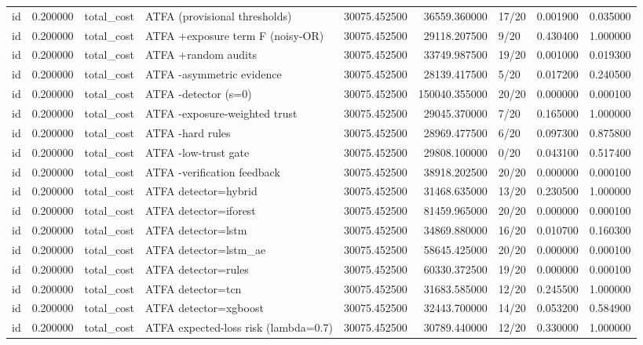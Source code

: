 \begin{tabular}{lrllrrlrr}
id & 0.200000 & total\_cost & ATFA (provisional thresholds) & 30075.452500 & 36559.360000 & 17/20 & 0.001900 & 0.035000 \\
id & 0.200000 & total\_cost & ATFA +exposure term F (noisy-OR) & 30075.452500 & 29118.207500 & 9/20 & 0.430400 & 1.000000 \\
id & 0.200000 & total\_cost & ATFA +random audits & 30075.452500 & 33749.987500 & 19/20 & 0.001000 & 0.019300 \\
id & 0.200000 & total\_cost & ATFA -asymmetric evidence & 30075.452500 & 28139.417500 & 5/20 & 0.017200 & 0.240500 \\
id & 0.200000 & total\_cost & ATFA -detector (s=0) & 30075.452500 & 150040.355000 & 20/20 & 0.000000 & 0.000100 \\
id & 0.200000 & total\_cost & ATFA -exposure-weighted trust & 30075.452500 & 29045.370000 & 7/20 & 0.165000 & 1.000000 \\
id & 0.200000 & total\_cost & ATFA -hard rules & 30075.452500 & 28969.477500 & 6/20 & 0.097300 & 0.875800 \\
id & 0.200000 & total\_cost & ATFA -low-trust gate & 30075.452500 & 29808.100000 & 0/20 & 0.043100 & 0.517400 \\
id & 0.200000 & total\_cost & ATFA -verification feedback & 30075.452500 & 38918.202500 & 20/20 & 0.000000 & 0.000100 \\
id & 0.200000 & total\_cost & ATFA detector=hybrid & 30075.452500 & 31468.635000 & 13/20 & 0.230500 & 1.000000 \\
id & 0.200000 & total\_cost & ATFA detector=iforest & 30075.452500 & 81459.965000 & 20/20 & 0.000000 & 0.000100 \\
id & 0.200000 & total\_cost & ATFA detector=lstm & 30075.452500 & 34869.880000 & 16/20 & 0.010700 & 0.160300 \\
id & 0.200000 & total\_cost & ATFA detector=lstm\_ae & 30075.452500 & 58645.425000 & 20/20 & 0.000000 & 0.000100 \\
id & 0.200000 & total\_cost & ATFA detector=rules & 30075.452500 & 60330.372500 & 19/20 & 0.000000 & 0.000100 \\
id & 0.200000 & total\_cost & ATFA detector=tcn & 30075.452500 & 31683.585000 & 12/20 & 0.245500 & 1.000000 \\
id & 0.200000 & total\_cost & ATFA detector=xgboost & 30075.452500 & 32443.700000 & 14/20 & 0.053200 & 0.584900 \\
id & 0.200000 & total\_cost & ATFA expected-loss risk (lambda=0.7) & 30075.452500 & 30789.440000 & 12/20 & 0.330000 & 1.000000 \\

\end{tabular}
